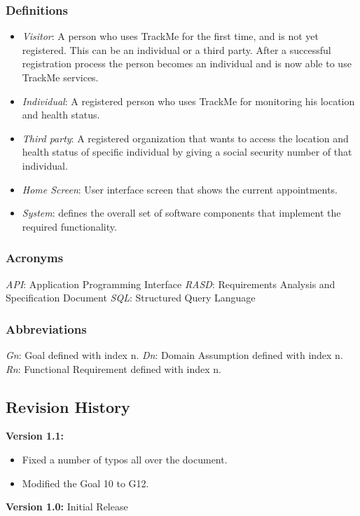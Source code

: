 \documentclass[12pt]{article}
\begin{document}
\subsubsection{Definitions}
\begin{itemize}
\item \textit{Visitor}: A person who uses TrackMe for the first time, and is not yet registered. This can be an individual or a third party. After a successful registration process the person becomes an individual and is now able to use TrackMe services.
\item \textit{Individual}: A registered person who uses TrackMe for monitoring his location and health status.
\item \textit{Third party}: A registered organization that wants to access the location and health status of specific individual by giving a social security number of that individual.
\item \textit{Home Screen}: User interface screen that shows the current appointments.

\item \textit{System}: defines the overall set of software components that implement the required functionality.
\end{itemize}


\subsubsection{Acronyms}
\textit{API}: Application Programming Interface\newline
\textit{RASD}: Requirements Analysis and Specification Document\newline
\textit{SQL}: Structured Query Language\newline
\subsubsection{Abbreviations}
\textit{Gn}: Goal defined with index n.\newline
\textit{Dn}: Domain Assumption defined with index n.\newline
\textit{Rn}: Functional Requirement defined with index n.
\subsection{Revision History}
\textbf{Version 1.1:} 
\begin{itemize}
    \item Fixed a number of typos all over the document.
    \item Modified the Goal 10 to G12.

\end{itemize}
\textbf{Version 1.0:} Initial Release
\newpage
\end{document}
